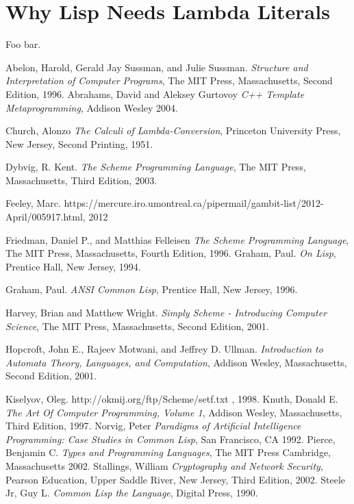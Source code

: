  \chapter{Why Lisp Needs Lambda Literals}
  \label{sec:appendixliteral}

 Foo bar.


 
\begin{thebibliography}{9}

  Abelon, Harold, Gerald Jay Sussman, and Julie Sussman.
  \emph{Structure and Interpretation of Computer Programs},
  The MIT Press, Massachusetts,
  Second Edition,
  1996.
  Abrahams, David and Aleksey Gurtovoy
  \emph{C++ Template Metaprogramming},
  Addison Wesley
  2004.

  Church, Alonzo
  \emph{The Calculi of Lambda-Conversion},
  Princeton University Press, New Jersey,
  Second Printing,
  1951.

  Dybvig, R. Kent.
  \emph{The Scheme Programming Language},
  The MIT Press, Massachusetts,
  Third Edition,
  2003.

  Feeley, Marc. https://mercure.iro.umontreal.ca/pipermail/gambit-list/2012-April/005917.html, 2012

  Friedman, Daniel P., and Matthias Felleisen
  \emph{The Scheme Programming Language},
  The MIT Press, Massachusetts,
  Fourth Edition,
  1996.
  Graham, Paul.
  \emph{On Lisp},
  Prentice Hall, New Jersey,
  1994.

  Graham, Paul.
  \emph{ANSI Common Lisp},
  Prentice Hall, New Jersey,
  1996.

  Harvey, Brian and Matthew Wright.
  \emph{Simply Scheme - Introducing Computer Science},
  The MIT Press, Massachusetts,
  Second Edition,
  2001.

  Hopcroft, John E., Rajeev Motwani, and Jeffrey D. Ullman.
  \emph{Introduction to Automata Theory, Languages, and Computation},
  Addison Wesley, Massachusetts,
  Second Edition,
  2001.

  Kiselyov, Oleg. http://okmij.org/ftp/Scheme/setf.txt , 1998.
  Knuth, Donald E.
  \emph{The Art Of Computer Programming, Volume 1},
  Addison Wesley, Massachusetts,
  Third Edition,
  1997.
  Norvig, Peter
  \emph{Paradigms of Artificial Intelligence Programming: Case Studies in Common Lisp},
  San Francisco, CA
  1992.
  Pierce, Benjamin C.
  \emph{Types and Programming Languages},
  The MIT Press
  Cambridge, Massachusetts
  2002.
  Stallings, William
  \emph{Cryptography and Network Security},
  Pearson Education, Upper Saddle River, New Jersey,
  Third Edition,
  2002.
  Steele Jr, Guy L.
  \emph{Common Lisp the Language},
  Digital Press,
  1990.




\end{thebibliography}
 \printindex


